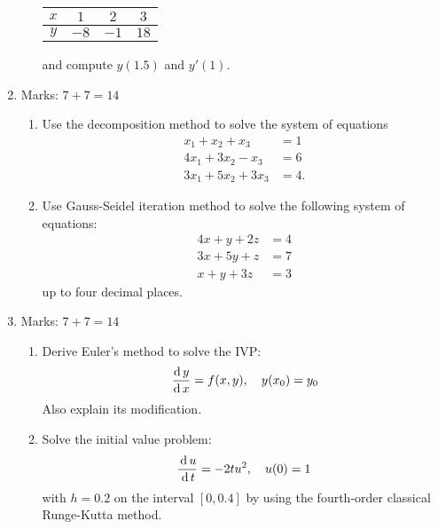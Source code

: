 \documentclass[12pt,class=book,crop=false]{standalone}
\begin{document}
\begin{enumerate}
\begin{enumerate}
\begin{table}[H]
\begin{tabular}{|c|c|c|c|}
                $ x $& $ 1 $&$  2 $& $ 3 $\\\hline               
                $ y $ & $ -8 $& $ -1 $& $ 18 $\\\hline
            \end{tabular}
        \end{table}
        and compute $ y(1.5) $ and $ y'(1) $.
    \end{enumerate}
    \item Marks: $ 7+7=14 $
    \begin{enumerate}
        \item Use the decomposition method to solve the system of equations
        \begin{align*}
            x_1 + x_2 + x_3 &= 1\\
            4x_1 +3x_2 - x_3 &= 6\\
            3x_1 + 5x_2 + 3x_3 &= 4.
        \end{align*}
        \item Use Gauss-Seidel iteration method to solve the following system of equations:
        \begin{align*}
            4x +y + 2z &= 4\\
            3x + 5y +z &= 7\\
            x +y+ 3z &= 3
        \end{align*}
        up to four decimal places.
    \end{enumerate}
    \item Marks: $ 7+7=14 $
    \begin{enumerate}
        \item Derive Euler's method to solve the IVP:
        \[
            \,\frac{\mathrm{d}\,y}{\mathrm{d}\,x} = f(x, y),\quad y(x_0) = y_0
        \]
        Also explain its modification.
        \item Solve the initial value problem:
        \[
            \frac{\,\mathrm{d}\, u}{\,\mathrm{d}\, t} =-2tu^2,\quad u(0) = 1
        \]
        with $ h = 0.2 $ on the interval $ [0,0.4] $ by using the fourth-order classical Runge-Kutta method.
    \end{enumerate}
\end{enumerate}
\newpage
\end{document}
